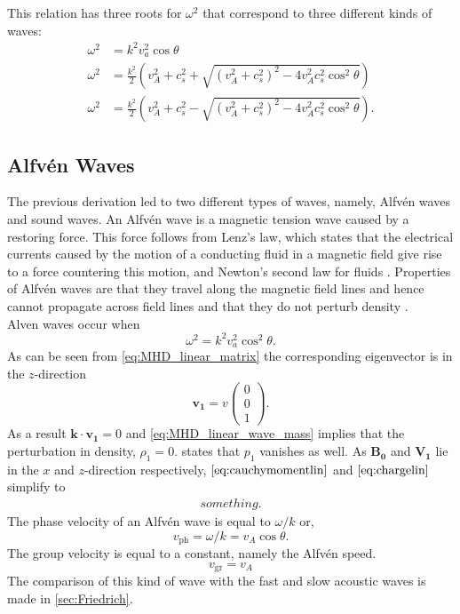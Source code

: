 \documentclass{article}
\begin{document}
This relation has three roots for $\omega^2$ that correspond to three different kinds of waves:
\begin{align*}
	\omega^2 &=  k^2v_a^2\cos\theta \tag{Alv\'en Waves} \\
	\omega^2 &= \frac{k^2}{2}\left( v_A^2 + c_s^2 + \sqrt{(v_A^2 + c_s^2)^2 - 4v_A^2c_s^2\cos^2\theta}  \right) \tag{Fast acoustic waves}\\
	\omega^2 &= \frac{k^2}{2}\left( v_A^2 + c_s^2 - \sqrt{(v_A^2 + c_s^2)^2 - 4v_A^2c_s^2\cos^2\theta}  \right) \tag{Slow acoustic waves}
.\end{align*}
\subsection{Alfv\'en Waves}
The previous derivation led to two different types of waves, namely, Alfv\'en waves and sound waves. An Alfv\'en wave is a magnetic tension wave caused by a restoring force. 
This force follows from Lenz's law, which states that the electrical currents caused by the motion of a conducting fluid in a magnetic field give rise to a force countering this motion, and Newton's second law for fluids \cite{Finlay2007}. 
Properties of Alfv\'en waves are that they travel along the magnetic field lines and hence cannot propagate across field lines and that they do not perturb density \cite{mhdppt}.\\


Alven waves occur when \[
\omega^2 = k^2v_a^2\cos^2 \theta
.\] 
As can be seen from \cref{eq:MHD_linear_matrix} the corresponding eigenvector is in the $z$-direction \[
	\mathbf{v_1} = v \begin{pmatrix} 0 \\ 0 \\ 1 \end{pmatrix} 
.\] 
As a result $\mathbf k \cdot \mathbf{v_1} = 0$ and \cref{eq:MHD_linear_wave_mass} implies that the perturbation in density, $\rho_1  = 0$.  states that $p_1$ vanishes as well. 
As $\mathbf{B_0}$  and $\mathbf{V_1}$ lie in the $x$ and $z$-direction respectively, $\cref{eq:cauchymomentlin}$ and $\cref{eq:chargelin}$ simplify to
\begin{align*}
something
.\end{align*}
The phase velocity of an Alfv\'en wave is equal to $\omega/k$ or,
\begin{equation*}
    v_{\text{ph}} = \omega/k = v_A \cos\theta.
\end{equation*}
The group velocity is equal to a constant, namely the Alfv\'en speed.
\begin{equation*}
    v_{\text{gr}} = v_A
\end{equation*}
The comparison of this kind of wave with the fast and slow acoustic waves is made in \cref{sec:Friedrich}.
\end{document}
